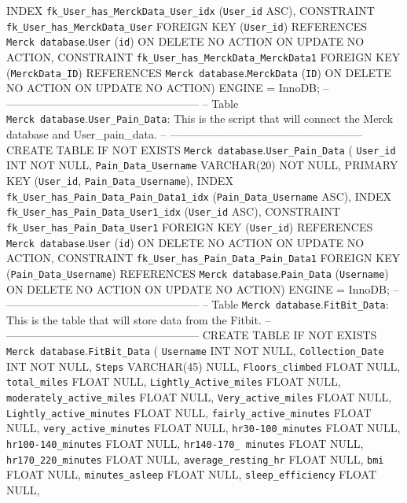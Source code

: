 \documentclass[]{book}
\begin{document}
INDEX \texttt{fk\_User\_has\_MerckData\_User\_idx} (\texttt{User\_id} ASC),
CONSTRAINT \texttt{fk\_User\_has\_MerckData\_User}
FOREIGN KEY (\texttt{User\_id})
REFERENCES \texttt{Merck\ database}.\texttt{User} (\texttt{id})
ON DELETE NO ACTION
ON UPDATE NO ACTION,
CONSTRAINT \texttt{fk\_User\_has\_MerckData\_MerckData1}
FOREIGN KEY (\texttt{MerckData\_ID})
REFERENCES \texttt{Merck\ database}.\texttt{MerckData} (\texttt{ID})
ON DELETE NO ACTION
ON UPDATE NO ACTION)
ENGINE = InnoDB;
-- -----------------------------------------------------
-- Table \texttt{Merck\ database}.\texttt{User\_Pain\_Data}: This is the script that will connect the Merck database and User\_pain\_data.
-- -----------------------------------------------------
CREATE TABLE IF NOT EXISTS \texttt{Merck\ database}.\texttt{User\_Pain\_Data} (
\texttt{User\_id} INT NOT NULL,
\texttt{Pain\_Data\_Username} VARCHAR(20) NOT NULL,
PRIMARY KEY (\texttt{User\_id}, \texttt{Pain\_Data\_Username}),
INDEX \texttt{fk\_User\_has\_Pain\_Data\_Pain\_Data1\_idx} (\texttt{Pain\_Data\_Username} ASC),
INDEX \texttt{fk\_User\_has\_Pain\_Data\_User1\_idx} (\texttt{User\_id} ASC),
CONSTRAINT \texttt{fk\_User\_has\_Pain\_Data\_User1}
FOREIGN KEY (\texttt{User\_id})
REFERENCES \texttt{Merck\ database}.\texttt{User} (\texttt{id})
ON DELETE NO ACTION
ON UPDATE NO ACTION,
CONSTRAINT \texttt{fk\_User\_has\_Pain\_Data\_Pain\_Data1}
FOREIGN KEY (\texttt{Pain\_Data\_Username})
REFERENCES \texttt{Merck\ database}.\texttt{Pain\_Data} (\texttt{Username})
ON DELETE NO ACTION
ON UPDATE NO ACTION)
ENGINE = InnoDB;
-- -----------------------------------------------------
-- Table \texttt{Merck\ database}.\texttt{FitBit\_Data}: This is the table that will store data from the Fitbit.
-- -----------------------------------------------------
CREATE TABLE IF NOT EXISTS \texttt{Merck\ database}.\texttt{FitBit\_Data} (
\texttt{Username} INT NOT NULL,
\texttt{Collection\_Date} INT NOT NULL,
\texttt{Steps} VARCHAR(45) NULL,
\texttt{Floors\_climbed} FLOAT NULL,
\texttt{total\_miles} FLOAT NULL,
\texttt{Lightly\_Active\_miles} FLOAT NULL,
\texttt{moderately\_active\_miles} FLOAT NULL,
\texttt{Very\_active\_miles} FLOAT NULL,
\texttt{Lightly\_active\_minutes} FLOAT NULL,
\texttt{fairly\_active\_minutes} FLOAT NULL,
\texttt{very\_active\_minutes} FLOAT NULL,
\texttt{hr30-100\_minutes} FLOAT NULL,
\texttt{hr100-140\_minutes} FLOAT NULL,
\texttt{hr140-170\_\ minutes} FLOAT NULL,
\texttt{hr170\_220\_minutes} FLOAT NULL,
\texttt{average\_resting\_hr} FLOAT NULL,
\texttt{bmi} FLOAT NULL,
\texttt{minutes\_asleep} FLOAT NULL,
\texttt{sleep\_efficiency} FLOAT NULL,
\end{document}
